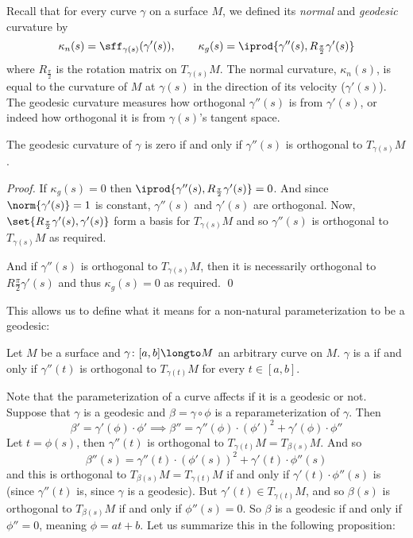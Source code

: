 Recall that for every curve $\gamma$ on a surface $M$, we defined its \emph{normal} and \emph{geodesic} curvature by
\[ \kappa_n(s) = \sff_{\gamma(s)}(\gamma'(s)),\qquad \kappa_g(s) = \iprod{\gamma''(s),R_{\frac\pi2}\gamma'(s)} \]
where $R_{\frac\pi2}$ is the rotation matrix on $T_{\gamma(s)}M$.
The normal curvature, $\kappa_n(s)$, is equal to the curvature of $M$ at $\gamma(s)$ in the direction of its velocity ($\gamma'(s)$).
The geodesic curvature measures how orthogonal $\gamma''(s)$ is from $\gamma'(s)$, or indeed how orthogonal it is from $\gamma(s)$'s tangent space.

\begin{prop*}

    The geodesic curvature of $\gamma$ is zero if and only if $\gamma''(s)$ is orthogonal to $T_{\gamma(s)}M$.

\end{prop*}

\begin{proof}

    If $\kappa_g(s)=0$ then $\iprod{\gamma''(s),R_{\frac\pi2}\gamma'(s)}=0$.
    And since $\norm{\gamma'(s)}=1$ is constant, $\gamma''(s)$ and $\gamma'(s)$ are orthogonal.
    Now, $\set{R_{\frac\pi2}\gamma'(s),\gamma'(s)}$ form a basis for $T_{\gamma(s)}M$ and so $\gamma''(s)$ is orthogonal to $T_{\gamma(s)}M$ as required.

    And if $\gamma''(s)$ is orthogonal to $T_{\gamma(s)}M$, then it is necessarily orthogonal to $R{\frac\pi2}\gamma'(s)$ and thus $\kappa_g(s)=0$ as required.
    \qed

\end{proof}

This allows us to define what it means for a non-natural parameterization to be a geodesic:

\begin{defn*}

    Let $M$ be a surface and $\gamma\colon[a,b]\longto M$ an arbitrary curve on $M$.
    $\gamma$ is a  if and only if $\gamma''(t)$ is orthogonal to $T_{\gamma(t)}M$ for every $t\in[a,b]$.

\end{defn*}

Note that the parameterization of a curve affects if it is a geodesic or not.
Suppose that $\gamma$ is a geodesic and $\beta=\gamma\circ\phi$ is a reparameterization of $\gamma$.
Then
\[ \beta' = \gamma'(\phi)\cdot\phi' \implies \beta'' = \gamma''(\phi)\cdot(\phi')^2 + \gamma'(\phi)\cdot\phi'' \]
Let $t=\phi(s)$, then $\gamma''(t)$ is orthogonal to $T_{\gamma(t)}M=T_{\beta(s)}M$.
And so
\[ \beta''(s) = \gamma''(t)\cdot(\phi'(s))^2 + \gamma'(t)\cdot\phi''(s) \]
and this is orthogonal to $T_{\beta(s)}M=T_{\gamma(t)}M$ if and only if $\gamma'(t)\cdot\phi''(s)$ is (since $\gamma''(t)$ is, since $\gamma$ is a geodesic).
But $\gamma'(t)\in T_{\gamma(t)}M$, and so $\beta(s)$ is orthogonal to $T_{\beta(s)}M$ if and only if $\phi''(s)=0$.
So $\beta$ is a geodesic if and only if $\phi''=0$, meaning $\phi=at+b$.
Let us summarize this in the following proposition:

